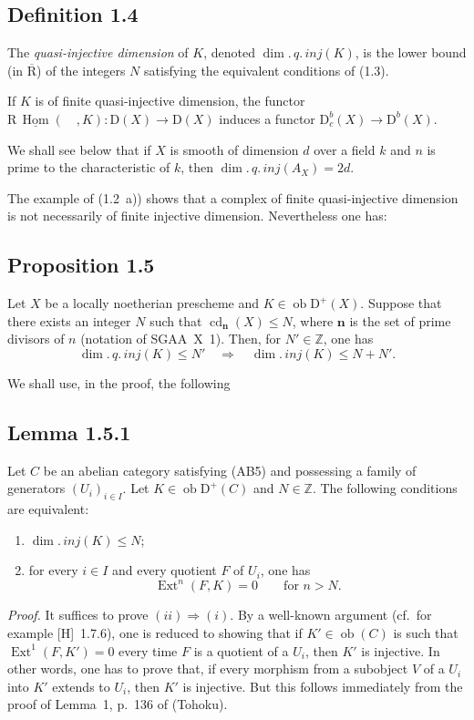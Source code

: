 \documentclass[11pt]{article}
\DeclareMathOperator{\Hom}{Hom}
\DeclareMathOperator{\Ext}{Ext}
\DeclareMathOperator{\cd}{cd}
\newcommand{\R}{\mathrm{R}}
\newcommand{\D}{\mathrm{D}}
\newcommand{\Z}{\mathbb{Z}}
\newcommand{\ob}{\operatorname{ob}}
\providecommand{\Hom}{\operatorname{Hom}}
\providecommand{\ob}{\operatorname{ob}}
\providecommand{\R}{\mathrm R}
\providecommand{\Z}{\mathbb Z}
\providecommand{\Hom}{\operatorname{Hom}}
\begin{document}
\subsection*{Definition 1.4}
The \emph{quasi-injective dimension} of $K$, denoted $\dim.\,q.\,inj(K)$, is the lower bound (in $\overline{\R}$) of the integers $N$ satisfying the equivalent conditions of (1.3).

If $K$ is of finite quasi-injective dimension, the functor $\R\,\underline{\Hom}(\quad,K) : \D(X) \to \D(X)$ induces a functor $\D_c^{b}(X) \to \D^{b}(X)$.

We shall see below that if $X$ is smooth of dimension $d$ over a field $k$ and $n$ is prime to the characteristic of $k$, then $\dim.\,q.\,inj(A_X) = 2d$.

The example of (1.2~a)) shows that a complex of finite quasi-injective dimension is not necessarily of finite injective dimension. Nevertheless one has:

\subsection*{Proposition 1.5}
Let $X$ be a locally noetherian prescheme and $K \in \ob \D^{+}(X)$. Suppose that there exists an integer $N$ such that $\cd_{\mathbf{n}}(X) \leqslant N$, where $\mathbf{n}$ is the set of prime divisors of $n$ (notation of SGAA~X~1). Then, for $N' \in \Z$, one has
\[
\dim.\,q.\,inj(K) \leqslant N' \quad \Longrightarrow \quad \dim.\,inj(K) \leqslant N + N'.
\]

We shall use, in the proof, the following

\subsection*{Lemma 1.5.1}
Let $C$ be an abelian category satisfying (AB5) and possessing a family of generators $(U_i)_{i \in I}$. Let $K \in \ob \D^{+}(C)$ and $N \in \Z$. The following conditions are equivalent:
\begin{enumerate}[label=(\roman*)]
\item $\dim.\,inj(K) \leqslant N$;
\item for every $i \in I$ and every quotient $F$ of $U_i$, one has
\[
\Ext^n(F,K) = 0 \qquad \text{for } n > N.
\]
\end{enumerate}

\emph{Proof.} It suffices to prove $(ii) \Rightarrow (i)$. By a well-known argument (cf.\ for example [H]~1.7.6), one is reduced to showing that if $K' \in \ob(C)$ is such that $\Ext^1(F,K') = 0$ every time $F$ is a quotient of a $U_i$, then $K'$ is injective. In other words, one has to prove that, if every morphism from a subobject $V$ of a $U_i$ into $K'$ extends to $U_i$, then $K'$ is injective. But this follows immediately from the proof of Lemma~1, p.~136 of (Tohoku).
\end{document}
